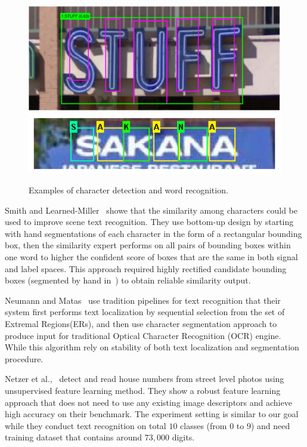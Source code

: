 \documentclass[10pt,twocolumn,letterpaper]{article}
\begin{document}
\begin{figure}[t]
\begin{center}
\includegraphics[width=1\linewidth]{fig/p1}
\includegraphics[width=1\linewidth]{fig/p10}
\end{center}
   \caption{Examples of character detection and word recognition.}
\label{fig:sample1}
\end{figure}

Smith and Learned-Miller~\cite{118} showe that the similarity among characters could be used to improve scene text recognition. They use bottom-up design by starting with hand segmentations of each character in the form of a rectangular bounding box, then the similarity expert performs on all pairs of bounding boxes within one word to higher the confident score of boxes that are the same in both signal and label spaces. This approach required highly rectified candidate bounding boxes (segmented by hand in~\cite{118}) to obtain reliable similarity output.

Neumann and Matas~\cite{120,119} use tradition pipelines for text recognition that their system first performs text localization by sequential selection from the set of Extremal Regions(ERs), and then use character segmentation approach to produce input for traditional Optical Character Recognition (OCR) engine. While this algorithm rely on stability of both text localization and segmentation procedure.

Netzer et al.,~\cite{121} detect and read house numbers from street level photos using unsupervised feature learning method. They show a robust feature learning approach that does not need to use any existing image descriptors and achieve high accuracy on their benchmark. The experiment setting is similar to our goal while they conduct text recognition on total $10$ classes (from $0$ to $9$) and need training dataset that contains around $73,000$ digits.
\end{document}
